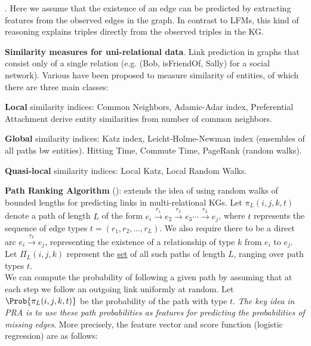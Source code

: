 \documentclass[11pt]{article}
\renewcommand\vec[2][]{\bm{#2}_{#1}}
\newcommand\myspace[1][]{\vspace{#1\bigskipamount}}
\newcommand\p{\Needspace{10\baselineskip} \noindent}
\begin{document}
\myspace
\p {}. Here we assume that the existence of an edge can be predicted by extracting features from the observed edges in the graph. In contrast to LFMs, this kind of reasoning explains triples directly from the observed triples in the KG.
\begin{compactitem}[-]
	\item \textbf{Similarity measures for uni-relational data}. Link prediction in graphs that consist only of a single relation (e.g. (Bob, isFriendOf, Sally) for a social network). Various  have been proposed to measure similarity of entities, of which there are three main classes:
	\begin{compactenum}
		\item \textbf{Local} similarity indices: Common Neighbors, Adamic-Adar index, Preferential Attachment derive entity similarities from number of common neighbors.
		
		\item \textbf{Global} similarity indices: Katz index, Leicht-Holme-Newman index (ensembles of all paths bw entities). Hitting Time, Commute Time, PageRank (random walks). 
		
		\item \textbf{Quasi-local} similarity indices: Local Katz, Local Random Walks.
	\end{compactenum}
	
	\item \textbf{Path Ranking Algorithm} (): extends the idea of using random walks of bounded lengths for predicting links in multi-relational KGs. Let $\pi_L(i,j,k,t)$ denote a path of length $L$ of the form  $e_i \xrightarrow{r_1} e_2 \xrightarrow{r_2} e_3 \cdots \xrightarrow{r_L} e_j$, where $t$ represents the sequence of edge types $t = (r_1, r_2, \ldots, r_L)$. We also require there to be a direct arc $e_i \xrightarrow{r_k} e_j$, representing the existence of a relationship of type $k$ from $e_i$ to $e_j$. Let $\Pi_L(i,j,k)$ represent the \underline{set} of all such paths of length $L$, ranging over path types $t$. \\
	
	\p We can compute the probability of following a given path by assuming that at each step we follow an outgoing link uniformly at random. Let $\Prob{\pi_L(i,j,k,t)}$ be the probability of the path with type $t$. \textit{The key idea in PRA is to use these path probabilities as features for predicting the probabilities of missing edges}. More precisely, the feature vector and score function (logistic regression) are as follows:
	\graybox{
		\vec[ijk]{\phi}^{PRA} &= [\Prob{\pi}: \pi \in \Pi_L(i,j,k)] \\
		f_{ijk}^{PRA} &:= \vec[k]{w}^T \vec[ijk]{\phi}^{PRA}	
	}
\end{compactitem}
\end{document}
